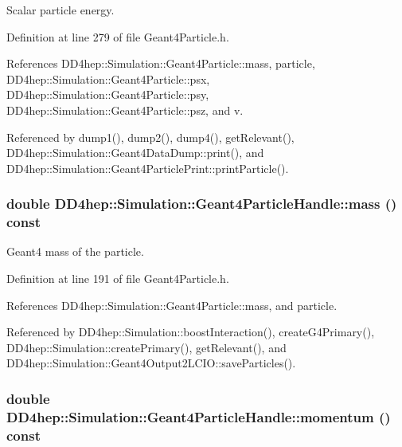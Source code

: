 Scalar particle energy. 

Definition at line 279 of file Geant4Particle.h.

References DD4hep::Simulation::Geant4Particle::mass, particle, DD4hep::Simulation::Geant4Particle::psx, DD4hep::Simulation::Geant4Particle::psy, DD4hep::Simulation::Geant4Particle::psz, and v.

Referenced by dump1(), dump2(), dump4(), getRelevant(), DD4hep::Simulation::Geant4DataDump::print(), and DD4hep::Simulation::Geant4ParticlePrint::printParticle().\hypertarget{class_d_d4hep_1_1_simulation_1_1_geant4_particle_handle_ae404682b2a931f51b7640f63e2226297}{
\subsubsection[{mass}]{\setlength{\rightskip}{0pt plus 5cm}double DD4hep::Simulation::Geant4ParticleHandle::mass () const}}
\label{class_d_d4hep_1_1_simulation_1_1_geant4_particle_handle_ae404682b2a931f51b7640f63e2226297}


Geant4 mass of the particle. 

Definition at line 191 of file Geant4Particle.h.

References DD4hep::Simulation::Geant4Particle::mass, and particle.

Referenced by DD4hep::Simulation::boostInteraction(), createG4Primary(), DD4hep::Simulation::createPrimary(), getRelevant(), and DD4hep::Simulation::Geant4Output2LCIO::saveParticles().\hypertarget{class_d_d4hep_1_1_simulation_1_1_geant4_particle_handle_a714e81dfd7fbc89bf31d65d7eecdbb7e}{
\subsubsection[{momentum}]{\setlength{\rightskip}{0pt plus 5cm}double DD4hep::Simulation::Geant4ParticleHandle::momentum () const}}
\label{class_d_d4hep_1_1_simulation_1_1_geant4_particle_handle_a714e81dfd7fbc89bf31d65d7eecdbb7e}


